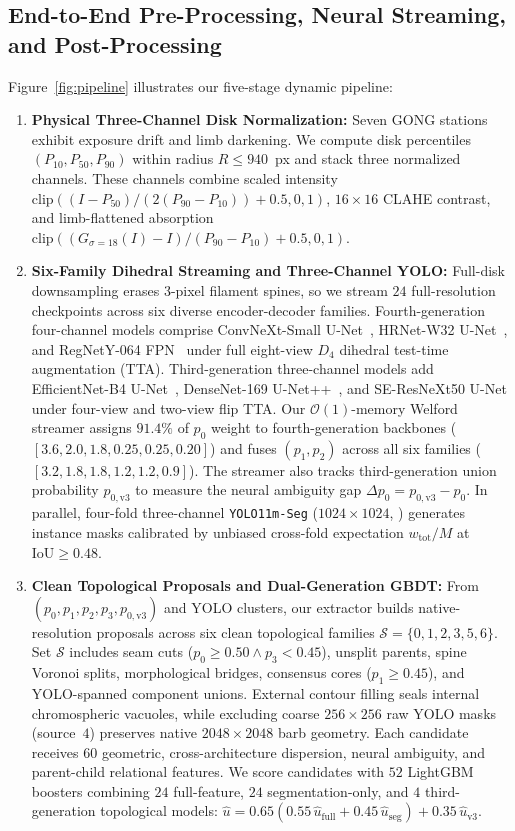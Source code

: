 \documentclass[sigconf]{acmart}
\begin{document}
\subsection{End-to-End Pre-Processing, Neural Streaming, and Post-Processing}
Figure~\ref{fig:pipeline} illustrates our five-stage dynamic pipeline:
\begin{enumerate}
  \item \textbf{Physical Three-Channel Disk Normalization:} Seven GONG stations exhibit exposure drift and limb darkening. We compute disk percentiles $(P_{10},P_{50},P_{90})$ within radius $R \le 940$~px and stack three normalized channels. These channels combine scaled intensity $\mathrm{clip}((I-P_{50})/\allowbreak(2(P_{90}-P_{10}))+0.5,0,1)$, $16\times 16$ CLAHE contrast, and limb-flattened absorption $\mathrm{clip}((G_{\sigma=18}(I)-I)/\allowbreak(P_{90}-P_{10})+0.5,0,1)$.
  \item \textbf{Six-Family Dihedral Streaming and Three-Channel YOLO:} Full-disk downsampling erases $3$-pixel filament spines, so we stream $24$ full-resolution checkpoints across six diverse encoder-decoder families. Fourth-generation four-channel models comprise ConvNeXt-Small U-Net~\cite{liu2022convnet}, HRNet-W32 U-Net~\cite{wang2020deep}, and RegNetY-064 FPN~\cite{radosavovic2020designing} under full eight-view $D_4$ dihedral test-time augmentation (TTA). Third-generation three-channel models add EfficientNet-B4 U-Net~\cite{tan2019efficientnet}, DenseNet-169 U-Net++~\cite{zhou2018unetplusplus}, and SE-ResNeXt50 U-Net under four-view and two-view flip TTA. Our $\mathcal{O}(1)$-memory Welford streamer assigns $91.4\%$ of $p_0$ weight to fourth-generation backbones ($[3.6,\allowbreak 2.0,\allowbreak 1.8,\allowbreak 0.25,\allowbreak 0.25,\allowbreak 0.20]$) and fuses $(p_1,p_2)$ across all six families ($[3.2,\allowbreak 1.8,\allowbreak 1.8,\allowbreak 1.2,\allowbreak 1.2,\allowbreak 0.9]$). The streamer also tracks third-generation union probability $p_{0,\mathrm{v3}}$ to measure the neural ambiguity gap $\Delta p_0 = p_{0,\mathrm{v3}}-p_0$. In parallel, four-fold three-channel \texttt{YOLO11m-Seg} ($1024\times 1024$, ) generates instance masks calibrated by unbiased cross-fold expectation $w_{\mathrm{tot}}/M$ at $\mathrm{IoU}\ge 0.48$.
  \item \textbf{Clean Topological Proposals and Dual-Generation GBDT:} From $(p_0,p_1,p_2,p_3,p_{0,\mathrm{v3}})$ and YOLO clusters, our extractor builds native-resolution proposals across six clean topological families $\mathcal{S}=\{0,1,2,3,5,6\}$. Set $\mathcal{S}$ includes seam cuts ($p_0\ge 0.50 \land p_3<0.45$), unsplit parents, spine Voronoi splits, morphological bridges, consensus cores ($p_1\ge 0.45$), and YOLO-spanned component unions. External contour filling seals internal chromospheric vacuoles, while excluding coarse $256\times 256$ raw YOLO masks (source~$4$) preserves native $2048\times 2048$ barb geometry. Each candidate receives $60$ geometric, cross-architecture dispersion, neural ambiguity, and parent-child relational features. We score candidates with $52$ LightGBM~\cite{ke2017lightgbm} boosters combining $24$ full-feature, $24$ segmentation-only, and $4$ third-generation topological models: $\hat{u}=0.65(0.55\,\hat{u}_{\mathrm{full}}+0.45\,\hat{u}_{\mathrm{seg}})+0.35\,\hat{u}_{\mathrm{v3}}$.

\end{enumerate}
\end{document}
